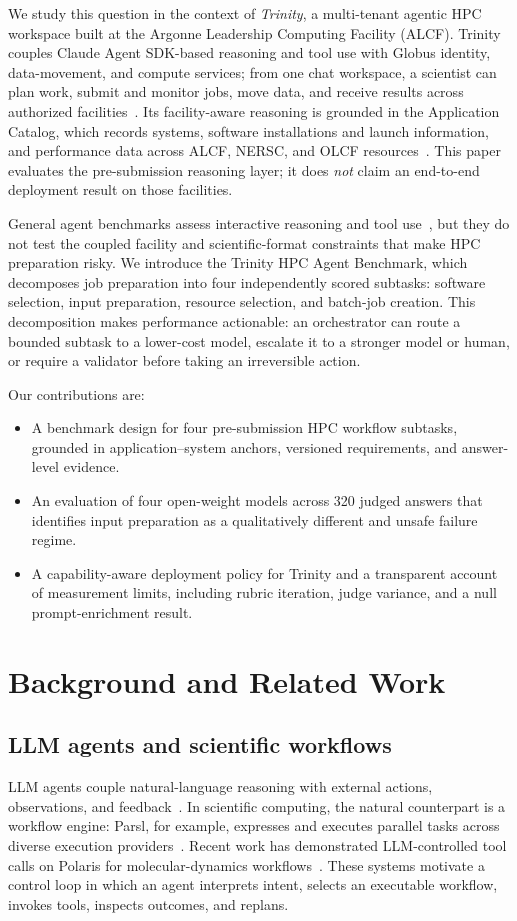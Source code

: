 \documentclass[conference]{IEEEtran}
\begin{document}
We study this question in the context of \emph{Trinity}, a multi-tenant agentic HPC workspace built at the Argonne Leadership Computing Facility (ALCF). Trinity couples Claude Agent SDK-based reasoning and tool use with Globus identity, data-movement, and compute services; from one chat workspace, a scientist can plan work, submit and monitor jobs, move data, and receive results across authorized facilities~\cite{trinitydocs}. Its facility-aware reasoning is grounded in the Application Catalog, which records systems, software installations and launch information, and performance data across ALCF, NERSC, and OLCF resources~\cite{applicationcatalog}. This paper evaluates the pre-submission reasoning layer; it does \emph{not} claim an end-to-end deployment result on those facilities.

General agent benchmarks assess interactive reasoning and tool use~\cite{liu2024agentbench,mialon2024gaia}, but they do not test the coupled facility and scientific-format constraints that make HPC preparation risky. We introduce the Trinity HPC Agent Benchmark, which decomposes job preparation into four independently scored subtasks: software selection, input preparation, resource selection, and batch-job creation. This decomposition makes performance actionable: an orchestrator can route a bounded subtask to a lower-cost model, escalate it to a stronger model or human, or require a validator before taking an irreversible action.

Our contributions are:
\begin{itemize}
  \item A benchmark design for four pre-submission HPC workflow subtasks, grounded in application--system anchors, versioned requirements, and answer-level evidence.
  \item An evaluation of four open-weight models across 320 judged answers that identifies input preparation as a qualitatively different and unsafe failure regime.
  \item A capability-aware deployment policy for Trinity and a transparent account of measurement limits, including rubric iteration, judge variance, and a null prompt-enrichment result.
\end{itemize}

\section{Background and Related Work}
\subsection{LLM agents and scientific workflows}
LLM agents couple natural-language reasoning with external actions, observations, and feedback~\cite{yao2023react}. In scientific computing, the natural counterpart is a workflow engine: Parsl, for example, expresses and executes parallel tasks across diverse execution providers~\cite{babuji2019parsl}. Recent work has demonstrated LLM-controlled tool calls on Polaris for molecular-dynamics workflows~\cite{ma2025connecting}. These systems motivate a control loop in which an agent interprets intent, selects an executable workflow, invokes tools, inspects outcomes, and replans.
\end{document}

